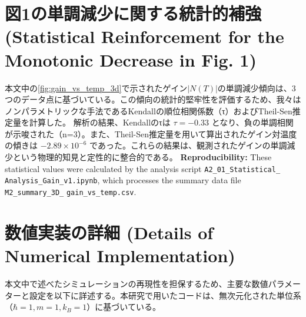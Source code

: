 \documentclass[a4paper,11pt,ja=standard,lualatex]{bxjsarticle}
\newcommand{\figref}[1]{\cref{#1}}
\begin{document}
\section{図1の単調減少に関する統計的補強 (Statistical Reinforcement for the Monotonic Decrease in Fig. 1)}
\label{sec:appendix_stats}
本文中の\figref{fig:gain_vs_temp_3d}で示されたゲイン$|N(T)|$の単調減少傾向は、3つのデータ点に基づいている。この傾向の統計的堅牢性を評価するため、我々はノンパラメトリックな手法であるKendallの順位相関係数（τ）およびTheil-Sen推定量を計算した。
解析の結果、Kendallのτは $\tau = -0.33$ となり、負の単調相関が示唆された（n=3）。また、Theil-Sen推定量を用いて算出されたゲイン対温度の傾きは $-2.89 \times 10^{-6}$ であった。これらの結果は、観測されたゲインの単調減少という物理的知見と定性的に整合的である。
\newline\newline
\textbf{Reproducibility:} These statistical values were calculated by the analysis script \texttt{A2\_01\_Statistical\_} \texttt{Analysis\_Gain\_v1.ipynb}, which processes the summary data file \texttt{M2\_summary\_3D\_} \texttt{gain\_vs\_temp.csv}.

\section{数値実装の詳細 (Details of Numerical Implementation)}
\label{sec:appendix_implementation}
本文中で述べたシミュレーションの再現性を担保するため、主要な数値パラメーターと設定を以下に詳述する。本研究で用いたコードは、無次元化された単位系（$\hbar=1, m=1, k_B=1$）に基づいている。
\end{document}
